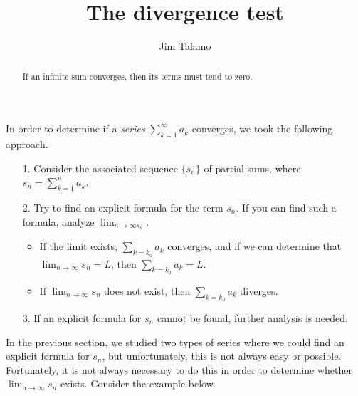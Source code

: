 \documentclass{ximera}
\author{Jim Talamo}
\title[Dig-In:]{The divergence test}
\begin{document}
\begin{abstract}
If an infinite sum converges, then its terms must tend to zero.
\end{abstract}
\maketitle

In order to determine if a \emph{series} $\sum_{k=1}^{\infty} a_k$ converges, we took the following approach.

\begin{itemize}
\item[1.] Consider the associated sequence $\{s_n\}$ of partial sums, where $s_n=\sum_{k=1}^n a_k$.
\item[2.] Try to find an explicit formula for the term $s_n$.  If you can find such a formula, analyze $\lim_{n \to \infty s_n}$.  
\begin{itemize}
\item If the limit exists, $\sum_{k=k_0} a_k$ converges, and if we can determine that $\lim_{n \to \infty} s_n =L$, then $\sum_{k=k_0} a_k=L$.  \item If  $\lim_{n \to \infty} s_n$ does not exist, then $\sum_{k=k_0} a_k$ diverges.
\end{itemize}
\item[3.] If an explicit formula for $s_n$ cannot be found, further analysis is needed.  
\end{itemize}

In the previous section, we studied two types of series where we could find an explicit formula for $s_n$, but unfortunately, this is not always easy or possible.  Fortunately, it is not always necessary to do this in order to determine whether $\lim_{n \to \infty} s_n$ exists.  Consider the example below.
\end{document}
